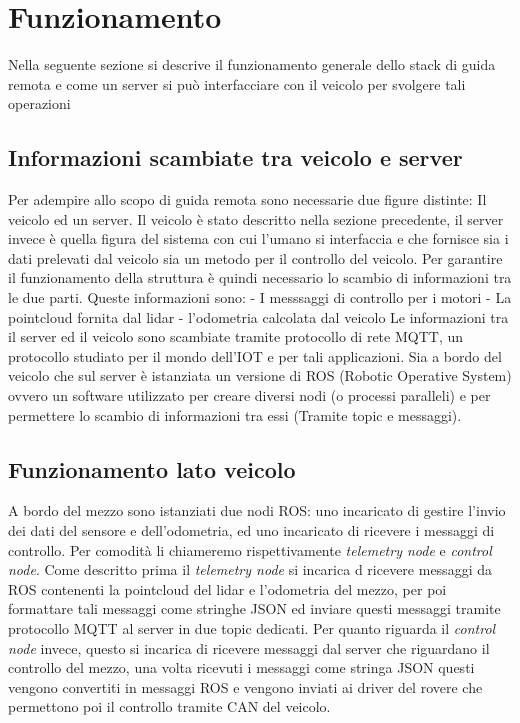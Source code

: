 \section{Funzionamento}
Nella seguente sezione si descrive il funzionamento generale dello stack di guida remota e come un server si può interfacciare con il veicolo per svolgere tali operazioni
\subsection{Informazioni scambiate tra veicolo e server}
Per adempire allo scopo di guida remota sono necessarie due figure distinte: Il veicolo ed un server. Il veicolo è stato descritto nella sezione precedente, il server invece è quella figura del sistema con cui l'umano si interfaccia e che fornisce sia i dati prelevati dal veicolo sia un metodo per il controllo del veicolo.
Per garantire il funzionamento della struttura è quindi necessario lo scambio di informazioni tra le due parti. Queste informazioni sono:
- I messsaggi di controllo per i motori
- La pointcloud fornita dal lidar
- l'odometria calcolata dal veicolo
Le informazioni tra il server ed il veicolo sono scambiate tramite protocollo di rete MQTT, un protocollo studiato per il mondo dell'IOT e per tali applicazioni.
Sia a bordo del veicolo che sul server è istanziata un versione di ROS (Robotic Operative System) ovvero un software utilizzato per creare diversi nodi (o processi paralleli) e per permettere lo scambio di informazioni tra essi (Tramite topic e messaggi).
\subsection{Funzionamento lato veicolo}
A bordo del mezzo sono istanziati due nodi ROS: uno incaricato di gestire l'invio dei dati del sensore e dell'odometria, ed uno incaricato di ricevere i messaggi di controllo. Per comodità li chiameremo rispettivamente \textit{telemetry node} e \textit{control node}. 
Come descritto prima il \textit{telemetry node} si incarica d ricevere messaggi da ROS contenenti la pointcloud del lidar e l'odometria del mezzo, per poi formattare tali messaggi come stringhe JSON ed inviare questi messaggi tramite protocollo MQTT al server in due topic dedicati.
Per quanto riguarda il \textit{control node} invece, questo si incarica di ricevere messaggi dal server che riguardano il controllo del mezzo, una volta ricevuti i messaggi come stringa JSON questi vengono convertiti in messaggi ROS e vengono inviati ai driver del rovere che permettono poi il controllo tramite CAN del veicolo.
